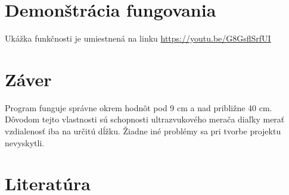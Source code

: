 \documentclass[a4paper, 11pt]{article}
\begin{document}
    \section{Demonštrácia fungovania}
    Ukážka funkčnosti je umiestnená na linku \href{https://youtu.be/G8GsflSrfUI}{https://youtu.be/G8GsflSrfUI}

	\section{Záver}
	Program funguje správne okrem hodnôt pod 9 cm a nad približne 40 cm. Dôvodom tejto vlastnosti sú schopnosti ultrazvukového merača diaľky
    merať vzdialenosť iba na určitú dĺžku. Žiadne iné problémy sa pri tvorbe projektu nevyskytli.

 
    \newpage
	\section{Literatúra}
	
    \renewcommand{\refname}{}
	
\end{document}
